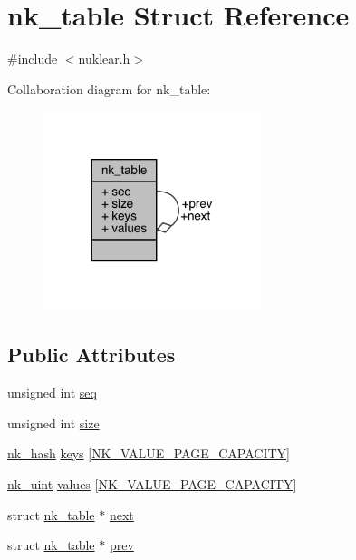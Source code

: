 \hypertarget{structnk__table}{}\section{nk\+\_\+table Struct Reference}
\label{structnk__table}


{\ttfamily \#include $<$nuklear.\+h$>$}



Collaboration diagram for nk\+\_\+table\+:
\nopagebreak
\begin{figure}[H]
\begin{center}
\leavevmode
\includegraphics[width=180pt]{structnk__table__coll__graph}
\end{center}
\end{figure}
\subsection*{Public Attributes}
\begin{DoxyCompactItemize}
\item 
unsigned int \mbox{\hyperlink{structnk__table_aa64704d2e52b6663f61c043b0378b2d4}{seq}}
\item 
unsigned int \mbox{\hyperlink{structnk__table_a173992867275727635fff4f21e825d99}{size}}
\item 
\mbox{\hyperlink{nuklear_8h_a2123e2728db7d1f136b57d6528a0d757}{nk\+\_\+hash}} \mbox{\hyperlink{structnk__table_abe02ed8fb83c928c36e8e719d64e2cbf}{keys}} \mbox{[}\mbox{\hyperlink{nuklear_8h_a8dc0d705f81317352b98df20a6481b52}{N\+K\+\_\+\+V\+A\+L\+U\+E\+\_\+\+P\+A\+G\+E\+\_\+\+C\+A\+P\+A\+C\+I\+TY}}\mbox{]}
\item 
\mbox{\hyperlink{nuklear_8h_a951b598a3101b6d2a55d22ac39f57919}{nk\+\_\+uint}} \mbox{\hyperlink{structnk__table_ae686139ae8eb9913024a5513c70bde76}{values}} \mbox{[}\mbox{\hyperlink{nuklear_8h_a8dc0d705f81317352b98df20a6481b52}{N\+K\+\_\+\+V\+A\+L\+U\+E\+\_\+\+P\+A\+G\+E\+\_\+\+C\+A\+P\+A\+C\+I\+TY}}\mbox{]}
\item 
struct \mbox{\hyperlink{structnk__table}{nk\+\_\+table}} $\ast$ \mbox{\hyperlink{structnk__table_a36a783e6a8874a8c0d793275d08355a4}{next}}
\item 
struct \mbox{\hyperlink{structnk__table}{nk\+\_\+table}} $\ast$ \mbox{\hyperlink{structnk__table_af01641e8389afdefbeb1e6a6e52dc557}{prev}}
\end{DoxyCompactItemize}


